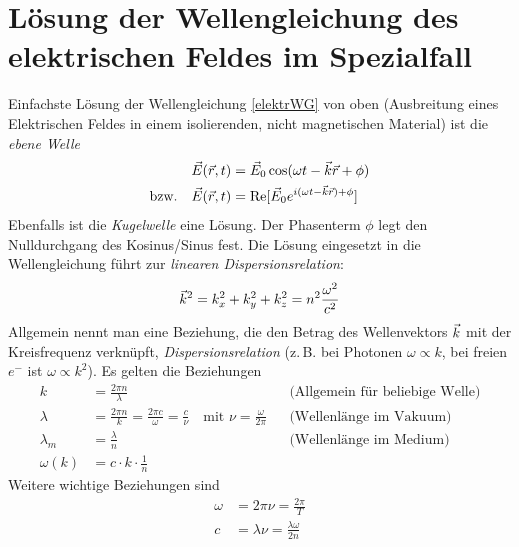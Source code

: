 \section[Lösung der Wellengleichung]{Lösung der Wellengleichung des elektrischen Feldes im Spezialfall}
Einfachste Lösung der Wellengleichung \eqref{elektrWG} von oben
(Ausbreitung eines Elektrischen Feldes in einem isolierenden, nicht
magnetischen Material) ist die 
\emph{ebene Welle}%
%
\begin{align*}
  \vec{E}(\vec{r},t)&= \vec{E}_0 \cos(\omega t- \vec{k}\vec{r}+\phi)\\
  \text{bzw.}\quad\vec{E}(\vec{r},t)&= \operatorname{Re}[\vec{E}_0e^{i(\omega t-\vec{k}\vec{r})+\phi}]
\end{align*}
Ebenfalls ist die \emph{Kugelwelle}%
eine Lösung. Der Phasenterm $\phi$ legt den Nulldurchgang des
Kosinus/Sinus fest. Die Lösung eingesetzt in die Wellengleichung führt
zur \emph{linearen Dispersionsrelation}:
\begin{align*}
  \vec{k}^2=k_x^2+k_y^2+k_z^2=n^2\frac{\omega^2}{c^2}
\end{align*}
Allgemein nennt man eine Beziehung, die den Betrag des Wellenvektors $\vec{k}$%
%
mit der Kreisfrequenz
verknüpft, \emph{Dispersionsrelation} 
(z.\,B. bei Photonen $\omega\propto k$, bei freien $e^-$ ist
$\omega\propto k^2$).
Es gelten die Beziehungen
\begin{align*}
  k &= \frac{2\pi n}{\lambda}
  &&\text{(Allgemein für beliebige Welle)}\\
  \lambda &= \frac{2\pi n}{k} = \frac{2\pi c}{\omega}=\frac{c}{\nu}
            \quad \text{mit } \nu=\frac{\omega}{2\pi}
  &&\text{(Wellenlänge im Vakuum)}\\
  \lambda_m &= \frac{\lambda}{n} 
  &&\text{(Wellenlänge im Medium)}\\
  \omega(k) &= c\cdot k\cdot \frac{1}{n}
\end{align*}%
%
%
Weitere wichtige Beziehungen sind
\begin{align*}
  \omega&=2\pi \nu =\frac{2\pi}{T}\\
  c&=\lambda\nu=\frac{\lambda\omega}{2n}
\end{align*}%
